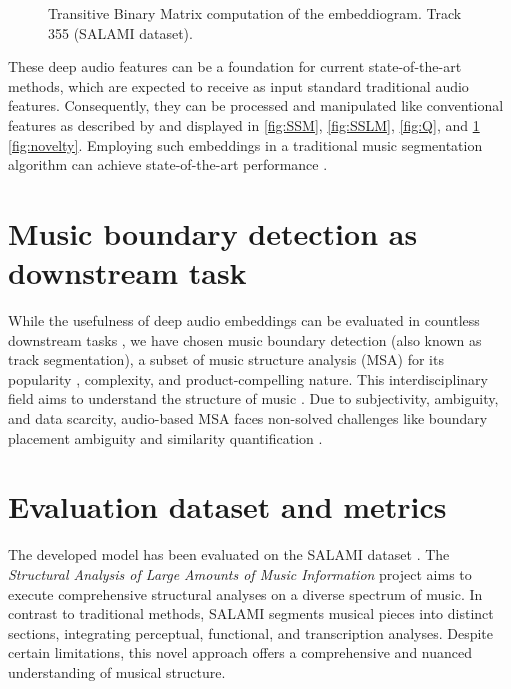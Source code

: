 \begin{figure}[ht]
\begin{minipage}{0.45\textwidth}
        \caption[Track 355 (SALAMI dataset). Transitive Binary Similarity Matrix]{Transitive Binary Matrix computation of the embeddiogram. Track 355 (SALAMI dataset).}
        \label{fig:TBSM}
    \end{minipage}
\end{figure}


These deep audio features can be a foundation for current state-of-the-art methods, which are expected to receive as input standard traditional audio features. Consequently, they can be processed and manipulated like conventional features as described by \cite{unsuperMSA} and displayed in \ref{fig:SSM}, \ref{fig:SSLM}, \ref{fig:Q}, and \ref{fig:TBSM} \ref{fig:novelty}. Employing such embeddings in a traditional music segmentation algorithm can achieve state-of-the-art performance \cite{deepfeaturesegment}.


\section{Music boundary detection as downstream task}

While the usefulness of deep audio embeddings can be evaluated in countless downstream tasks \cite{Li2023MERT:Training, Kim2020OneStrategies}, we have chosen music boundary detection (also known as track segmentation), a subset of music structure analysis (MSA) for its popularity \cite{Smith2013ATask}, complexity, and product-compelling nature. This interdisciplinary field aims to understand the structure of music \cite{Nieto2020Audio-BasedApplications}. Due to subjectivity, ambiguity, and data scarcity, audio-based MSA faces non-solved challenges like boundary placement ambiguity and similarity quantification \cite{NietoPerceptualMusic}.  


\section{Evaluation dataset and metrics}

The developed model has been evaluated on the SALAMI dataset \cite{Smith2011DESIGNANNOTATIONS}. The \textit{Structural Analysis of Large Amounts of Music Information} project aims to execute comprehensive structural analyses on a diverse spectrum of music. In contrast to traditional methods, SALAMI segments musical pieces into distinct sections, integrating perceptual, functional, and transcription analyses. Despite certain limitations, this novel approach offers a comprehensive and nuanced understanding of musical structure.

